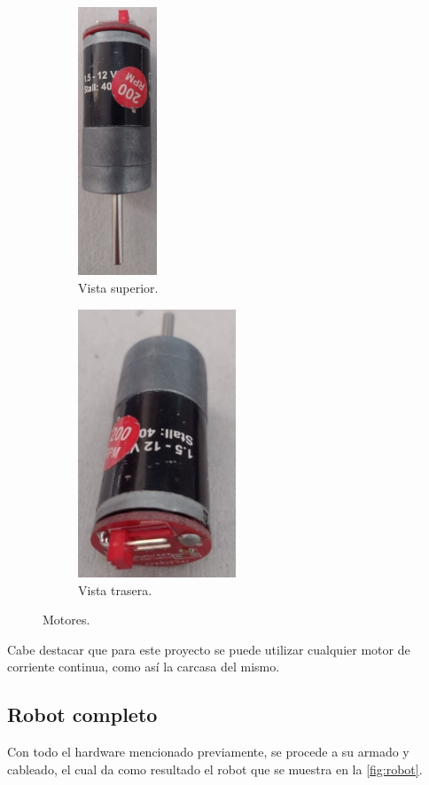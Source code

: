\documentclass[11pt,a4paper]{article}
\begin{document}
	\begin{figure}[h!]
		\centering
		\begin{subfigure}{8cm}
			\centering
			\includegraphics[height=8cm]{imagenes/Motor1-.jpg}
			\caption{Vista superior.}
		\end{subfigure}
		\hfill
		\begin{subfigure}{8cm}
			\centering
			\includegraphics[height=8cm]{imagenes/Motor2-.jpg}
			\caption{Vista trasera.}
		\end{subfigure}
		
		\caption{Motores.}
		\label{fig:motores}
	\end{figure}
	
	Cabe destacar que para este proyecto se puede utilizar cualquier motor de corriente continua, como así la carcasa del mismo.
	
	\subsection{Robot completo}
	Con todo el hardware mencionado previamente, se procede a su armado y cableado, el cual da como resultado el robot que se muestra en la \autoref*{fig:robot}.
	
\end{document}
